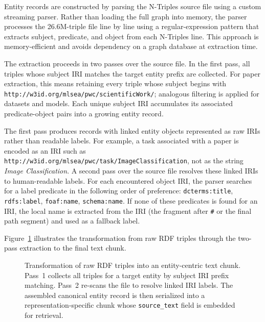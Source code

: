 Entity records are constructed by parsing the N-Triples source file using
a custom streaming parser.
Rather than loading the full graph into memory, the parser processes the
26.6M-triple file line by line using a regular-expression pattern that
extracts subject, predicate, and object from each N-Triples line.
This approach is memory-efficient and avoids dependency on a graph database
at extraction time.

The extraction proceeds in two passes over the source file.
In the first pass, all triples whose subject IRI matches the target entity
prefix are collected.
For paper extraction, this means retaining every triple whose subject begins
with \texttt{http://w3id.org/mlsea/pwc/scientificWork/}; analogous filtering
is applied for datasets and models.
Each unique subject IRI accumulates its associated predicate-object pairs into
a growing entity record.

The first pass produces records with linked entity objects represented as
raw IRIs rather than readable labels.
For example, a task associated with a paper is encoded as an IRI such as
\texttt{http://w3id.org/mlsea/pwc/task/ImageClassification}, not as the
string \textit{Image Classification}.
A second pass over the source file resolves these linked IRIs to human-readable
labels.
For each encountered object IRI, the parser searches for a label predicate in
the following order of preference: \texttt{dcterms:title}, \texttt{rdfs:label},
\texttt{foaf:name}, \texttt{schema:name}.
If none of these predicates is found for an IRI, the local name is extracted
from the IRI (the fragment after \texttt{\#} or the final path segment) and
used as a fallback label.

Figure~\ref{fig:rdf_to_chunk} illustrates the transformation from raw RDF
triples through the two-pass extraction to the final text chunk.

\begin{figure}[htbp]
  \centering
  \caption{Transformation of raw RDF triples into an entity-centric text chunk.
    Pass~1 collects all triples for a target entity by subject IRI prefix
    matching. Pass~2 re-scans the file to resolve linked IRI labels. The
    assembled canonical entity record is then serialized into a
    representation-specific chunk whose \texttt{source\_text} field is
    embedded for retrieval.}
  \label{fig:rdf_to_chunk}
\end{figure}

